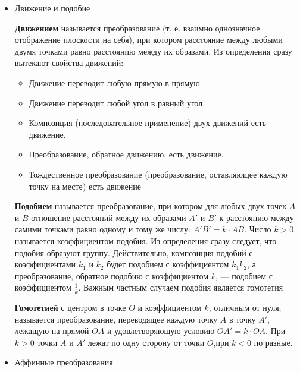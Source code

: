 \documentclass[]{article}
\begin{document}
	\begin{itemize}[noitemsep]
		\item Движение и подобие
		
		\textbf{Движением} называется преобразование (т. е.
		взаимно однозначное отображение плоскости на себя), при котором расстояние между любыми двумя точками равно расстоянию между их образами.
		Из определения сразу вытекают свойства движений:
		\begin{itemize}[noitemsep]
			\item Движение переводит любую прямую в прямую.
			\item Движение переводит любой угол в равный угол.
			\item Композиция (последовательное применение) двух движений есть
			движение.
			\item Преобразование, обратное движению, есть движение.
			\item Тождественное преобразование (преобразование, оставляющее
			каждую точку на месте) есть движение
		\end{itemize}	
		
		\textbf{Подобием} называется преобразование, при котором для любых двух точек $A$ и $B$ отношение расстояний между их образами $A'$ и $B'$ к расстоянию между самими точками равно одному и тому
		же числу: $A'B'= k \cdot AB$. Число $k > 0$ называется коэффициентом подобия. Из определения сразу следует, что подобия образуют группу. Действительно, композиция подобий с коэффициентами $k_1$ и $k_2$ будет подобием с коэффициентом $k_1k_2$, а преобразование, обратное подобию с коэффициентом $k$, — подобием с коэффициентом $\frac{1}{k}$. Важным частным случаем подобия является гомотетия
		
		\textbf{Гомотетией} с центром в точке $O$ и коэффициентом $k$, отличным от нуля, называется преобразование, переводящее каждую точку $A$ в точку $A'$, лежащую на прямой $OA$ и удовлетворяющую условию $OA' = k \cdot OA$. При $k > 0$ точки $A$ и $A'$ лежат по одну сторону от точки $O$,при $k < 0$ по разные.
		\item Аффинные преобразования
		

\end{itemize}
\end{document}
